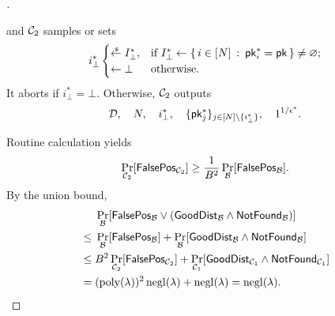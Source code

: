 \begin{proof}[]
\begin{itemize}
and ${\mathcal{C}}_2$ samples or sets
\begin{align*}
i_\bot^\ast\begin{cases}
\draws I_\bot^\ast,&\textup{if }
I_\bot^\ast\gets
\{\,
{i\in[N]}
\::\:
{\pk_i^\ast=\pk}
\,\}\neq\varnothing;\\
\gets\bot&\textup{otherwise}.
\end{cases}
\end{align*}
It aborts if ${i_\bot^\ast=\bot}$.
Otherwise, ${\mathcal{C}}_2$ outputs
\begin{align*}
\scriptD,\quad
N,\quad
i_\bot^\ast,\quad
\{\pk_j^\ast\}_{j\in{[N]\setminus{\{i_\bot^\ast\}}}},\quad
1^{1/\epsilon^\ast}.
\end{align*}
\end{itemize}
Routine calculation yields
\begin{align*}
\Pr_{\scriptC_2}[\FalsePos_{\scriptC_2}]
\geq\frac{1}{B^2}\Pr_\scriptB[\FalsePos_\scriptB].
\end{align*}
By the union bound,
\begin{align*}
&
\Pr_\scriptB[\FalsePos_\scriptB\vee(\GoodDist_\scriptB\wedge\NotFound_\scriptB)]
\\{}\leq{}&
\Pr_\scriptB[\FalsePos_\scriptB]
+
\Pr_\scriptB[\GoodDist_\scriptB\wedge\NotFound_\scriptB]
\\{}\leq{}&
B^2\Pr_{\scriptC_2}[\FalsePos_{\scriptC_2}]
+
\Pr_{\scriptC_1}[\GoodDist_{\scriptC_1}\wedge\NotFound_{\scriptC_1}]
\WideNarrow{}{\hspace*{-1em}}
\\{}={}&
(\poly(\lambda))^2\negl(\lambda)+\negl(\lambda)
=
\negl(\lambda).
\qedhere
\end{align*}
\end{proof}
